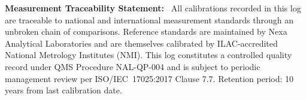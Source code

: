 \noindent
\begin{tcolorbox}[
  enhanced,
  colback=NexaBlue!5,
  colframe=NexaBlue,
  arc=3pt,
  boxrule=0.8pt,
  left=8pt, right=8pt, top=5pt, bottom=5pt
]
{\small\textcolor{NexaBlue}{\bfseries\faLink\; Measurement Traceability Statement:}}
{\small\ All calibrations recorded in this log are traceable to national and international measurement standards through an unbroken chain of comparisons. Reference standards are maintained by Nexa Analytical Laboratories and are themselves calibrated by ILAC-accredited National Metrology Institutes (NMI). This log constitutes a controlled quality record under QMS Procedure NAL-QP-004 and is subject to periodic management review per ISO/IEC~17025:2017 Clause 7.7. Retention period: 10 years from last calibration date.}
\end{tcolorbox}
